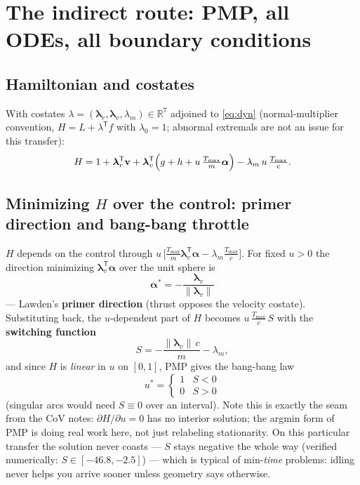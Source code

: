 \documentclass[11pt,letterpaper]{article}
\theoremstyle{noteplain}
\newcommand{\R}{\mathbb{R}}
\newcommand{\T}{^{\mathsf{T}}}
\newcommand{\vvec}{\mathbf{v}}
\newcommand{\lamr}{\bm{\lambda}_r}
\newcommand{\lamv}{\bm{\lambda}_v}
\newcommand{\lamm}{\lambda_m}
\begin{document}
\section{The indirect route: PMP, all ODEs, all boundary conditions}

\subsection*{Hamiltonian and costates}

With costates $\lambda = (\lamr, \lamv, \lamm) \in \R^7$ adjoined to
\eqref{eq:dyn} (normal-multiplier convention, $H = L + \lambda\T f$ with
$\lambda_0 = 1$; abnormal extremals are not an issue for this transfer):
\begin{equation}\label{eq:ham}
  H = 1 + \lamr\T\vvec
      + \lamv\T\Bigl(g + h + u\,\tfrac{T_{\max}}{m}\bm\alpha\Bigr)
      - \lamm\,u\,\tfrac{T_{\max}}{c}.
\end{equation}

\subsection*{Minimizing $H$ over the control: primer direction and bang-bang throttle}

$H$ depends on the control through
$u\,\bigl[\tfrac{T_{\max}}{m}\lamv\T\bm\alpha - \lamm \tfrac{T_{\max}}{c}\bigr]$.
For fixed $u > 0$ the direction minimizing $\lamv\T\bm\alpha$ over the unit
sphere is
\begin{equation}\label{eq:primer}
  \bm\alpha^* = -\frac{\lamv}{\|\lamv\|}
\end{equation}
--- Lawden's \textbf{primer direction} (thrust opposes the velocity costate).
Substituting back, the $u$-dependent part of $H$ becomes
$u\,\tfrac{T_{\max}}{c}\,S$ with the \textbf{switching function}
\begin{equation}\label{eq:switch}
  S = -\frac{\|\lamv\|\,c}{m} - \lamm ,
\end{equation}
and since $H$ is \emph{linear} in $u$ on $[0,1]$, PMP gives the bang-bang law
\begin{equation}\label{eq:bang}
  u^* = \begin{cases} 1 & S < 0\\ 0 & S > 0 \end{cases}
\end{equation}
(singular arcs would need $S \equiv 0$ over an interval). Note this is
exactly the seam from the CoV notes: $\partial H/\partial u = 0$ has no
interior solution; the argmin form of PMP is doing real work here, not
just relabeling stationarity. On this particular transfer the solution
never coasts --- $S$ stays negative the whole way (verified numerically:
$S \in [-46.8, -2.5]$) --- which is typical of min-\emph{time} problems:
idling never helps you arrive sooner unless geometry says otherwise.
\end{document}
